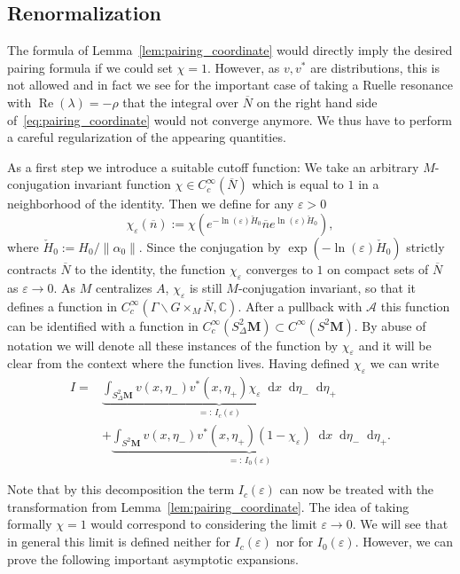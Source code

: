 \documentclass[AHL, Unicode, longabstracts, published]{cedram}
\DeclareMathOperator{\Real}{Re}
\newcommand{\cc}{\mathbb{C}}
\let\Re=\Real
\renewcommand{\Re}{\operatorname{Re}}
\newcommand{\intd}{\mathop{}\!\mathrm{d}}
\newcommand{\bn}{{\overline{n}}}
\newcommand{\bN}{{\overline{N}}}
\newcommand{\cH}{{\check{H}_0}}
\begin{document}
\subsection{Renormalization}
The formula of Lemma~\ref{lem:pairing_coordinate} would directly imply the desired pairing formula if we could set $\chi=1$. However, as $v,v^*$ are distributions, this is not allowed and in fact we see for the important case of taking a Ruelle resonance with $\Re(\lambda)=-\rho$ that the integral over $\bN$ on the right hand side of~\eqref{eq:pairing_coordinate} would not converge anymore. We thus have to perform a careful regularization of the appearing quantities.

As a first step we introduce a suitable cutoff function: We take an arbitrary $M$-conjugation invariant function $\chi\in C_c^\infty(\bN)$ which is equal to $1$ in a neighborhood of the identity. Then we define for any $\varepsilon>0$
\[
\chi_\varepsilon(\bn) := \chi\left(e^{-\ln(\varepsilon)\cH}\bn e^{\ln(\varepsilon)\cH}\right),
\]
where $\check H_0:= H_0/\|\alpha_0\|$. Since the conjugation by $\exp({-\ln(\varepsilon)\cH})$ strictly contracts $\bN$ to the identity, the function $\chi_\varepsilon$ converges to $1$ on compact sets of $\bN$ as $\varepsilon \to 0$. As $M$ centralizes $A$, $\chi_\varepsilon$ is still $M$-conjugation invariant, so that it defines a function in $C_c^\infty(\Gamma\backslash G\times_M \bN, \cc)$. After a pullback with $\mathcal A$ this function can be identified with a function in $C_c^ \infty(S^2_\Delta\mathbf M)\subset C^\infty(S^2\mathbf M)$. By abuse of notation we will denote all these instances of the function by $\chi_\varepsilon$ and it will be clear from the context where the function lives. Having defined $\chi_\varepsilon$ we can write
\begin{align*}
I= & \underbrace{\int_{S^2_\Delta\mathbf M} v(x,\eta_-)v^*(x,\eta_+) \chi_\varepsilon \intd x\intd
\eta_-\intd \eta_+}_{=:\,I_c(\varepsilon)} \\
& +\underbrace{\int_{S^2\mathbf M} v(x,\eta_-)v^*(x,\eta_+) (1- \chi_\varepsilon) \intd x\intd
\eta_-\intd \eta_+}_{=:\,I_0(\varepsilon)}.
\end{align*}

Note that by this decomposition the term $I_c(\varepsilon)$ can now be treated with the transformation from Lemma~\ref{lem:pairing_coordinate}. The idea of taking formally $\chi=1$ would correspond to considering the limit $\varepsilon\to 0$. We will see that in general this limit is defined neither for $I_c(\varepsilon)$ nor for $I_0(\varepsilon)$. However, we can prove the following important asymptotic expansions.
\end{document}
